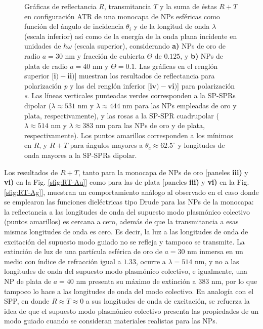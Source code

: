 \begin{figure}[h!]
\begin{subfigure}{.7\linewidth}
		\end{subfigure}\vspace*{-.5em}
	\caption{Gráficas de reflectancia $R$, transmitancia $T$ y la suma de éstas $R+T$   en configuración ATR de una monocapa de NPs esféricas como función del ángulo de incidencia $\theta_i$ y de la longitud de onda $\lambda$ (escala inferior) así como de la energía de la onda plana incidente en unidades de $\hbar\omega$ (escala superior), considerando \textbf{a)} NPs de oro de radio $a=30$ nm y fracción de cubierta $\Theta$ de $0.125$, y \textbf{b)} NPs de plata de radio $a=40$ nm y $\Theta=0.1$.  Las gráficas   en el renglón superior [$\mathbf{i)-ii)}$]  muestran los resultados de reflectancia para  polarización \emph{p} y las del renglón inferior  [$\mathbf{iv)-vi)}$] para polarización  \emph{s}. Las líneas verticales punteadas verdes corresponden a la SP-SPRs dipolar ($\lambda\approx 531$ nm y $\lambda\approx 444$ nm para las NPs empleadas de oro y plata, respectivamente), y las rosas a la SP-SPR cuadrupolar ($\lambda\approx 514$ nm y $\lambda\approx 383$ nm para las NPs de oro y de plata, respectivamente). Los puntos amarillos corresponden a los mínimos en $R$, y $R+T$ para ángulos mayores a $\theta_c\approx 62.5^\circ$ y longitudes de onda mayores a la SP-SPRs dipolar. }\label{fig:RT-AuAg}
	\end{figure}	

Los resultados de $R+T$, tanto para la monocapa de NPs de oro [paneles \textbf{iii)} y \textbf{vi)} en la Fig. \ref{sfig:RT-Au}] como para las de plata [paneles \textbf{iii)} y \textbf{vi)} en la Fig. \ref{sfig:RT-Ag}], muestran un comportamiento análogo al observado en el caso donde se emplearon las funciones dieléctricas tipo Drude para las NPs de la monocapa: la reflectancia a las longitudes de onda del supuesto modo plasmónico colectivo (puntos amarillos) es cercana a cero, además de que la transmitancia a esas mismas longitudes de onda es cero. Es decir, la luz a las longitudes de onda de excitación del supuesto modo guiado no se refleja y tampoco se transmite. La extinción de luz de una partícula esférica de oro de $a=30$ nm inmersa en un medio con índice de refracción igual a $1.33$, ocurre a $\lambda= 514$ nm, y no a las longitudes de onda del supuesto modo plasmónico colectivo, e igualmente, una NP de plata de $a=40$ nm presenta su máximo de extinción a $383$ nm, por lo que tampoco lo hace a las longitudes de onda del modo colectivo. En analogía con el SPP, en donde $R\approx T\approx 0$ a sus longitudes de onda de excitación, se refuerza la idea de que el supuesto modo plasmónico colectivo presenta las propiedades de un modo guiado cuando se consideran materiales realistas para las NPs.


